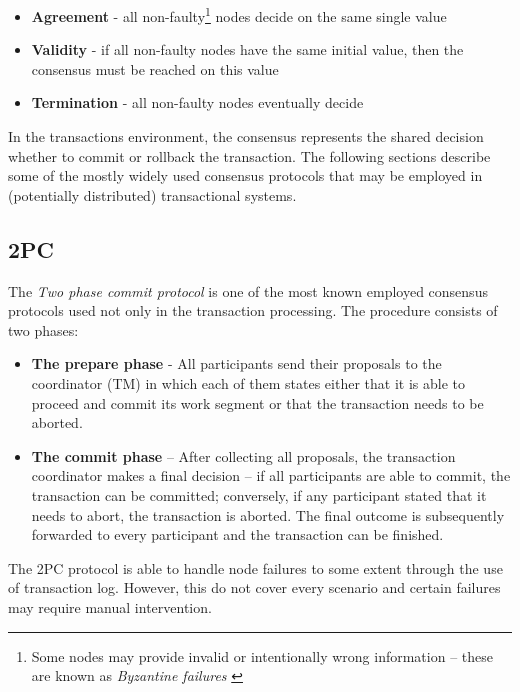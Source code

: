 \documentclass[oneside,
  digital, %
  table,   %
  nolof,     %
  nolot,     %
]{fithesis3}
\begin{document}
\begin{itemize}
    \item \textbf{Agreement} - all non-faulty\footnote{Some nodes may provide invalid or intentionally wrong information -- these are known as \textit{Byzantine failures} \cite{byzantine-generals-problem}} nodes decide on the same single value
    \item \textbf{Validity} - if all non-faulty nodes have the same initial value, then the consensus must be reached on this value
    \item \textbf{Termination} - all non-faulty nodes eventually decide
\end{itemize}


In the transactions environment, the consensus represents the shared decision whether to commit or rollback the transaction. The following sections describe some of the mostly widely used consensus protocols that may be employed in (potentially distributed) transactional systems.

\subsection{2PC}

The \textit{Two phase commit protocol} is one of the most known employed consensus protocols used not only in the transaction processing. The procedure consists of two phases:

\begin{itemize}
    \item \textbf{The prepare phase} - All participants send their proposals to the coordinator (TM) in which each of them states either that it is able to proceed and commit its work segment or that the transaction needs to be aborted.
    
    \item \textbf{The commit phase} -- After collecting all proposals, the transaction coordinator makes a final decision -- if all participants are able to commit, the transaction can be committed; conversely, if any participant stated that it needs to abort, the transaction is aborted. The final outcome is subsequently forwarded to every participant and the transaction can be finished.
\end{itemize}

The 2PC protocol is able to handle node failures to some extent through the use of transaction log. However, this do not cover every scenario and certain failures may require manual intervention.
\end{document}
